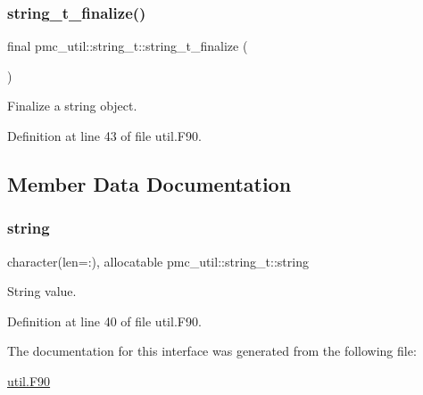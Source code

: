 \subsubsection{\texorpdfstring{string\+\_\+t\+\_\+finalize()}{string\_t\_finalize()}}
{\footnotesize\ttfamily final pmc\+\_\+util\+::string\+\_\+t\+::string\+\_\+t\+\_\+finalize (\begin{DoxyParamCaption}{ }\end{DoxyParamCaption})\hspace{0.3cm}{\ttfamily [final]}}



Finalize a string object. 



Definition at line 43 of file util.\+F90.



\subsection{Member Data Documentation}
\mbox{\label{structpmc__util_1_1string__t_ac8f93877b726054873d5d17fb2e25e15}} 
\subsubsection{\texorpdfstring{string}{string}}
{\footnotesize\ttfamily character(len=\+:), allocatable pmc\+\_\+util\+::string\+\_\+t\+::string}



String value. 



Definition at line 40 of file util.\+F90.



The documentation for this interface was generated from the following file\+:\begin{DoxyCompactItemize}
\item 
\mbox{\hyperlink{util_8_f90}{util.\+F90}}\end{DoxyCompactItemize}
